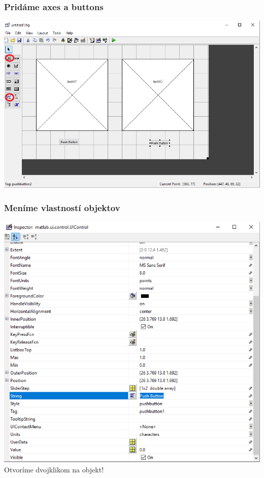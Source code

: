 \documentclass{beamer}
\begin{document}
\begin{frame}
  \frametitle{Pridáme axes a buttons}
  \centering
  \includegraphics[width=\textwidth, height=0.8\textheight,keepaspectratio]{screens/elements.png}
\end{frame}

\begin{frame}
  \frametitle{Meníme vlastností objektov}
  \centering
  \includegraphics[width=\textwidth, height=0.7\textheight,keepaspectratio]{screens/inspector.png}\\
    Otvoríme dvojklikom na objekt!  
\end{frame}
\end{document}
